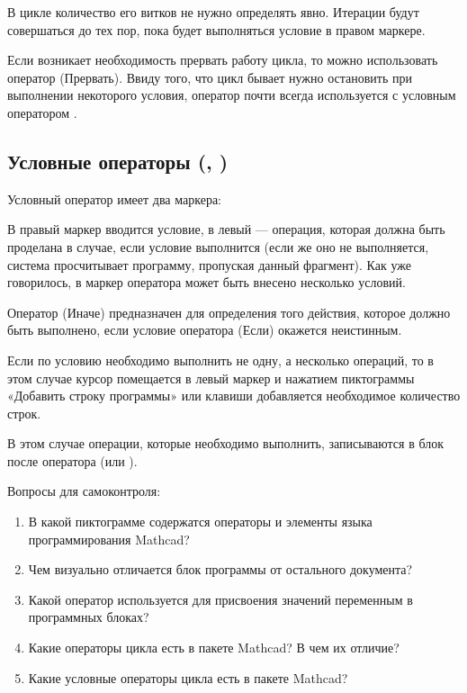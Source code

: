 В цикле  количество его витков не нужно определять явно. Итерации будут совершаться до тех пор, пока будет выполняться условие в правом маркере.

Если возникает необходимость прервать работу цикла, то можно использовать оператор  (Прервать). Ввиду того, что цикл бывает нужно остановить при выполнении некоторого условия, оператор  почти всегда используется с условным оператором .




\subsection*{Условные операторы (, )}
Условный оператор  имеет два маркера:

В правый маркер вводится условие, в левый --- операция, которая должна быть проделана в случае, если условие выполнится (если же оно не выполняется, система просчитывает программу, пропуская данный фрагмент). Как уже говорилось, в маркер оператора может быть внесено несколько условий.

Оператор  (Иначе) предназначен для определения того действия, которое должно быть выполнено, если условие оператора  (Если) окажется неистинным.

Если по условию необходимо выполнить не одну, а несколько операций, то в этом случае курсор помещается в левый маркер и нажатием пиктограммы «Добавить строку программы» или клавиши \keys{]} добавляется необходимое количество строк.


В этом случае операции, которые необходимо выполнить, записываются в блок после оператора  (или ).



Вопросы для самоконтроля:
\begin{enumerate}
	\item В какой пиктограмме содержатся операторы и элементы языка программирования Mathcad?
	\item Чем визуально отличается блок программы от остального документа?
	\item Какой оператор используется для присвоения значений переменным в программных блоках?
	\item Какие операторы цикла есть в пакете Mathcad? В чем их отличие?
	\item Какие условные операторы цикла есть в пакете Mathcad?
\end{enumerate}
